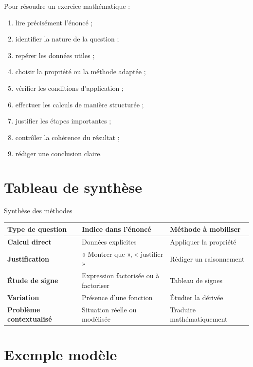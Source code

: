 \documentclass[11pt,a4paper]{article}
\begin{document}
\begin{cadremethode}
Pour résoudre un exercice mathématique :

\begin{enumerate}
    \item lire précisément l’énoncé ;
    \item identifier la nature de la question ;
    \item repérer les données utiles ;
    \item choisir la propriété ou la méthode adaptée ;
    \item vérifier les conditions d’application ;
    \item effectuer les calculs de manière structurée ;
    \item justifier les étapes importantes ;
    \item contrôler la cohérence du résultat ;
    \item rédiger une conclusion claire.
\end{enumerate}
\end{cadremethode}

\section{Tableau de synthèse}

\begin{cadregris}{Synthèse des méthodes}
\renewcommand{\arraystretch}{1.35}
\begin{tabularx}{\textwidth}{>{\bfseries}p{3.5cm}X X}
\toprule
Type de question & Indice dans l’énoncé & Méthode à mobiliser \\
\midrule
Calcul direct & Données explicites & Appliquer la propriété \\
Justification & « Montrer que », « justifier » & Rédiger un raisonnement \\
Étude de signe & Expression factorisée ou à factoriser & Tableau de signes \\
Variation & Présence d’une fonction & Étudier la dérivée \\
Problème contextualisé & Situation réelle ou modélisée & Traduire mathématiquement \\
\bottomrule
\end{tabularx}
\end{cadregris}

\section{Exemple modèle}
\end{document}
